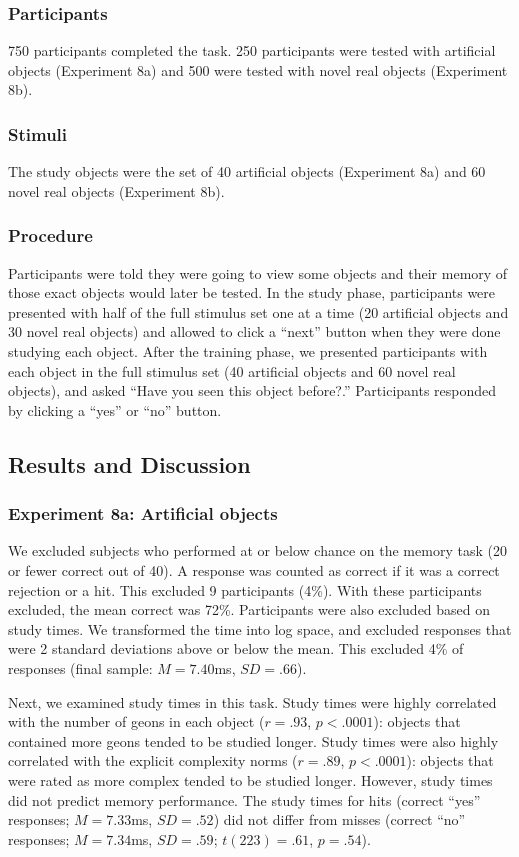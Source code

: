 \documentclass[man]{apa2}
\begin{document}
\subsubsection{Participants} 750 participants completed the task. 250 participants were tested with artificial objects (Experiment 8a) and 500 were tested with novel real objects (Experiment 8b).
\subsubsection{Stimuli} The study objects were the set of 40 artificial objects (Experiment 8a) and 60 novel real objects (Experiment 8b). 

\subsubsection{Procedure} Participants were told they were going to view some objects and their memory of those exact objects would later be tested. In the study phase, participants were presented with half of the full stimulus set one at a time (20 artificial objects and 30 novel real objects) and allowed to click a ``next'' button when they were done studying each object. After the training phase, we presented participants with each object in the full stimulus set (40 artificial objects and 60 novel real objects), and asked ``Have you seen this object before?.'' Participants responded by clicking a ``yes'' or ``no'' button.

\subsection{Results and Discussion } 
\subsubsection{Experiment 8a: Artificial objects} 
We excluded subjects who performed at or below chance on the memory task (20 or fewer correct out of 40). A response was counted as correct if it was a correct rejection or a hit. This excluded 9 participants (4\%). With these participants excluded, the mean correct was 72\%. Participants were also excluded based on study times. We transformed the time into log space, and excluded responses that were 2 standard deviations above or below the mean. This excluded 4\% of responses (final sample: $M = 7.40$ms, $SD = .66$). 

Next, we examined study times in this task. Study times were highly correlated with the number of geons in each object ($r=.93$, $p<.0001$): objects that contained more geons tended to be studied longer. Study times were also highly correlated with the explicit complexity norms ($r = .89$, $p < .0001$): objects that were rated as more complex tended to be studied longer. However, study times did not predict memory performance. The study times for hits (correct ``yes'' responses; $M = 7.33$ms, $SD = .52$) did not differ from misses (correct ``no'' responses; $M = 7.34$ms, $SD = .59$; $t(223) = .61$, $p=.54$).
\end{document}
